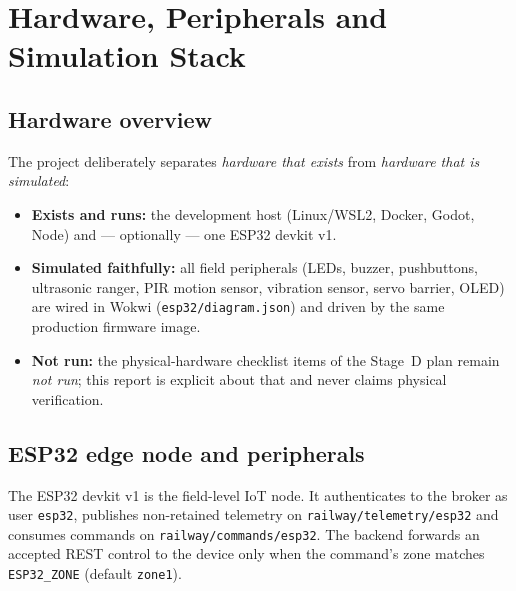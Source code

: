 \chapter{Hardware, Peripherals and Simulation Stack}\label{cha:hardware}

\section{Hardware overview}

The project deliberately separates \emph{hardware that exists} from
\emph{hardware that is simulated}:

\begin{itemize}
  \item \textbf{Exists and runs:} the development host (Linux/WSL2, Docker,
        Godot, Node) and --- optionally --- one ESP32 devkit v1.
  \item \textbf{Simulated faithfully:} all field peripherals
        (LEDs, buzzer, pushbuttons, ultrasonic ranger, PIR motion sensor,
        vibration sensor, servo barrier, OLED) are wired in Wokwi
        (\texttt{esp32/diagram.json}) and driven by the same production
        firmware image.
  \item \textbf{Not run:} the physical-hardware checklist items of the
        Stage~D plan remain \emph{not run}; this report is explicit about
        that and never claims physical verification.
\end{itemize}

\section{ESP32 edge node and peripherals}\label{sec:esp32}

The ESP32 devkit v1 is the field-level IoT node. It authenticates to the
broker as user \texttt{esp32}, publishes non-retained telemetry on
\texttt{railway/telemetry/esp32} and consumes commands on
\texttt{railway/commands/esp32}. The backend forwards an accepted REST
control to the device only when the command's zone matches
\texttt{ESP32\_ZONE} (default \texttt{zone1}).

